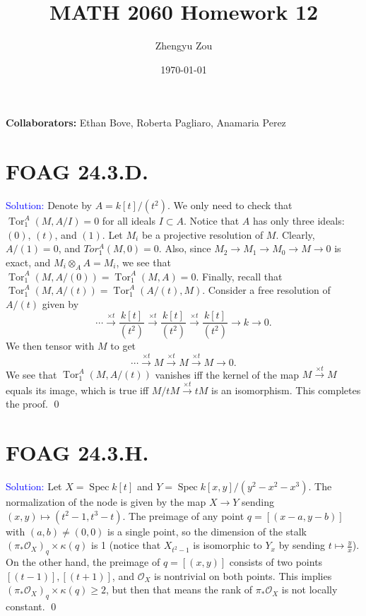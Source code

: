 \documentclass[11pt]{article}
\title{MATH 2060 Homework 12}
\author{Zhengyu Zou}
\date{\today}
\newcommand{\cO}{\mathcal{O}}
\DeclareMathOperator{\Spec}{\operatorname{Spec}}
\newcommand{\Tor}{\operatorname{Tor}}
\newenvironment{solution}{\begin{trivlist}\item[]{\textcolor{blue}{Solution:}}}{\qed \end{trivlist}}
\begin{document}
\maketitle

\textbf{Collaborators:} Ethan Bove, Roberta Pagliaro, Anamaria Perez

\section*{FOAG 24.3.D.}

\begin{solution}
    Denote by $A = k[t]/(t^2)$. 
    We only need to check that $\Tor_1^{A} (M, A / I) = 0$ for all ideals $I \subset A$. Notice that $A$ has only three ideals: $(0)$, $(t)$, and $(1)$. Let $M_i$ be a projective resolution of $M$. Clearly, $A / (1) = 0$, and $Tor_1^A (M, 0) = 0$. Also, since $M_2 \rightarrow M_1 \rightarrow M_0 \rightarrow M \rightarrow 0$ is exact, and $M_i \otimes_A A = M_i$, we see that $\Tor_1^A(M, A / (0)) = \Tor_1^A(M, A) = 0$. Finally, recall that $\Tor_1^A (M, A/(t)) = \Tor_1^A (A/(t), M)$. Consider a free resolution of $A/(t)$ given by 
    \[
        \cdots \xrightarrow{\times t} \frac{k[t]}{(t^2)} \xrightarrow{\times t} \frac{k[t]}{(t^2)} \xrightarrow{\times t} \frac{k[t]}{(t^2)} \rightarrow k \rightarrow 0.
    \]
    We then tensor with $M$ to get 
    \[
        \cdots \xrightarrow{\times t} M \xrightarrow{\times t} M \xrightarrow{\times t} M \rightarrow 0.
    \]
    We see that $\Tor_1^A(M, A/(t))$ vanishes iff the kernel of the map $M \xrightarrow{\times t} M$ equals its image, which is true iff $M / tM \xrightarrow{\times t} tM$ is an isomorphism. This completes the proof. 
\end{solution}

\newpage

\section*{FOAG 24.3.H.}

\begin{solution}
    Let $X = \Spec k[t]$ and $Y = \Spec k[x,y]/(y^2 - x^2 - x^3)$.
    The normalization of the node is given by the map $X \rightarrow Y$ sending $(x, y) \mapsto (t^2 - 1, t^3 - t)$. The preimage of any point $q = [(x-a,y-b)]$ with $(a,b) \neq (0,0)$ is a single point, so the dimension of the stalk $(\pi_* \cO_X)_q \times \kappa(q)$ is 1 (notice that $X_{t^2 - 1}$ is isomorphic to $Y_{x}$ by sending $t \mapsto \frac{y}{x}$). On the other hand, the preimage of $q = [(x,y)]$ consists of two points $[(t-1)], [(t+1)]$, and $\cO_X$ is nontrivial on both points. This implies $(\pi_* \cO_X)_q \times \kappa(q) \geq 2$, but then that means the rank of $\pi_* \cO_X$ is not locally constant. 
\end{solution}
\end{document}
